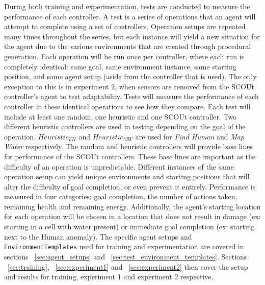 During both training and experimentation, tests are conducted to measure the performance of each controller.
A test is a series of operations that an agent will attempt to complete using a set of controllers.
Operation setups are repeated many times throughout the series, but each instance will yield a new situation for the agent due to the various environments that are created through procedural generation.
Each operation will be run once per controller, where each run is completely identical: same goal, same environment instance, same starting position, and same agent setup (aside from the controller that is used).
The only exception to this is in experiment 2, when sensors are removed from the SCOUt controller's agent to test adaptability.
Tests will measure the performance of each controller in these identical operations to see how they compare.
Each test will include at least one random, one heuristic and one SCOUt controller.
Two different heuristic controllers are used in testing depending on the goal of the operation.
$Heuristic_{FH}$ and $Heuristic_{MW}$ are used for \textit{Find Human} and \textit{Map Water} respectively.
The random and heuristic controllers will provide base lines for performance of the SCOUt controllers.
These base lines are important as the difficulty of an operation is unpredictable.
Different instances of the same operation setup can yield unique environments and starting positions that will alter the difficulty of goal completion, or even prevent it entirely.
Performance is measured in four categories: goal completion, the number of actions taken, remaining health and remaining energy.
Additionally, the agent's starting location for each operation will be chosen in a location that does not result in damage (ex: starting in a cell with water present) or immediate goal completion (ex: starting next to the Human anomaly).
The specific agent setups and \texttt{EnvironmentTemplates} used for training and experimentation are covered in sections ~\ref{sec:agent_setups} and ~\ref{sec:test_environment_templates}.
Sections ~\ref{sec:training}, ~\ref{sec:experiment1} and ~\ref{sec:experiment2} then cover the setup and results for training, experiment 1 and experiment 2 respective.


